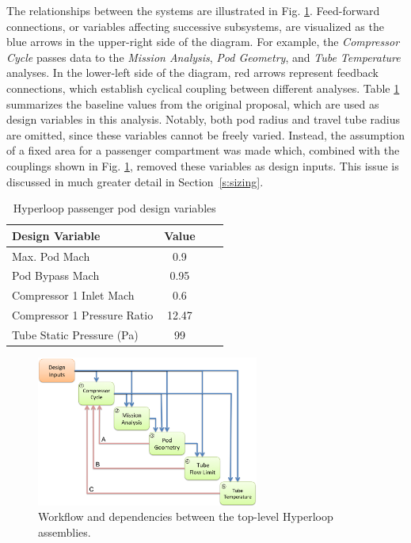 \documentclass[heading.tex]{subfiles}
\begin{document}
The relationships between the systems are illustrated in Fig. \ref{f:hyperloopXDSM}. 
Feed-forward connections, or variables affecting successive subsystems,
are visualized as the blue arrows in the upper-right side of the diagram.
For example, the \textit{Compressor Cycle} passes data to the \textit{Mission Analysis},
\textit{Pod Geometry}, and \textit{Tube Temperature} analyses.
In the lower-left side of the diagram, red arrows represent feedback connections, which establish cyclical coupling between different analyses.
Table \ref{tab:desvars} summarizes the baseline values from the original proposal, which are used as design variables in this analysis.
Notably, both pod radius and travel tube radius are omitted, since these variables cannot be freely varied.
Instead, the assumption of a fixed area for a passenger compartment was made which,
combined with the couplings shown in Fig. \ref{f:hyperloopXDSM}, removed these variables as design inputs.
This issue is discussed in much greater detail in Section~\ref{s:sizing}.

\begin{table}
    \centering
    \caption{Hyperloop passenger pod design variables}
    \label{tab:desvars}
    \begin{tabular}{l  c  c  c} 
        \hline \hline
        Design Variable &  Value\\ \hline \hline
        Max. Pod Mach & 0.9 \\ 
        Pod Bypass Mach & 0.95\\
        Compressor 1 Inlet Mach & 0.6\\ 
        Compressor 1 Pressure Ratio & 12.47\\ 
        Tube Static Pressure (Pa) & 99 \\ \hline
    \end{tabular}
\end{table}

\begin{figure}[hbtp]
\centering
\includegraphics[width=0.65\textwidth]{images/TopAssembly.png}
\caption{Workflow and dependencies between the top-level Hyperloop assemblies.}
\label{f:hyperloopXDSM}
\end{figure}
\end{document}

